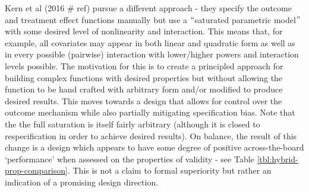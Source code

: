\documentclass[../main.tex]{subfiles}
\begin{document}
\vspace{\baselineskip}
Kern et al (2016 $\#$ ref) pursue a different approach - they specify the outcome and treatment effect functions manually but use a $``$saturated parametric model$"$  with some desired level of nonlinearity and interaction. This means that, for example, all covariates may appear in both linear and quadratic form as well as in every possible (pairwise) interaction with lower/higher powers and interaction levels possible. The motivation for this is to create a principled approach for building complex functions with desired properties but without allowing the function to be hand crafted with arbitrary form and/or modified to produce desired results. This moves towards a design that allows for control over the outcome mechanism while also partially mitigating specification bias. Note that the the full saturation is itself fairly arbitrary (although it is closed to respecification in order to achieve desired results). On balance, the result of this change is a design which appears to have some degree of positive across-the-board ‘performance’ when assessed on the properties of validity - see Table \ref{tbl:hybrid-prop-comparison}. This is not a claim to formal superiority but rather an indication of a promising design direction.\par


\vspace{\baselineskip}


\end{document}
